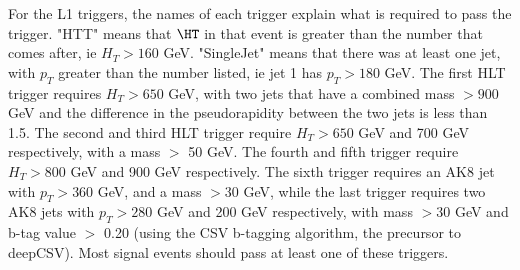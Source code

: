 For the L1 triggers, the names of each trigger explain what is required to pass the trigger. "HTT" means that $\HT$ in that event is greater than the number that comes after, ie $H_{T} > 160$ GeV. "SingleJet" means that there was at least one jet, with $p_{T}$ greater than the number listed, ie jet 1 has $p_{T} > 180$ GeV. The first HLT trigger requires $H_{T} > 650$ GeV, with two jets that have a combined mass $> 900$ GeV and the difference in the pseudorapidity between the two jets is less than 1.5. The second and third HLT trigger require $H_{T} > 650$ GeV and 700 GeV respectively, with a mass $>$ 50 GeV. The fourth and fifth trigger require $H_{T} > 800$ GeV and 900 GeV respectively. The sixth trigger requires an AK8 jet with $p_{T} > 360$ GeV, and a mass $> 30$ GeV, while the last trigger requires two AK8 jets with $p_{T} > 280$ GeV and 200 GeV respectively, with mass $> 30$ GeV and b-tag value $>$ 0.20 (using the CSV b-tagging algorithm, the precursor to deepCSV). Most signal events should pass at least one of these triggers.

